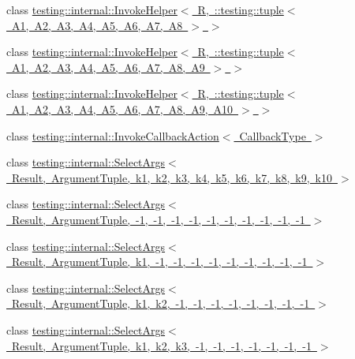 \begin{DoxyCompactItemize}
\item 
class \mbox{\hyperlink{classtesting_1_1internal_1_1_invoke_helper_3_01_r_00_01_1_1testing_1_1tuple_3_01_a1_00_01_a2_00_c90976166c933075c49792215d8203bb}{testing\+::internal\+::\+Invoke\+Helper$<$ R, \+::testing\+::tuple$<$ A1, A2, A3, A4, A5, A6, A7, A8 $>$ $>$}}
\item 
class \mbox{\hyperlink{classtesting_1_1internal_1_1_invoke_helper_3_01_r_00_01_1_1testing_1_1tuple_3_01_a1_00_01_a2_00_cb3e0694d0722fcc616ae618dc383e5b}{testing\+::internal\+::\+Invoke\+Helper$<$ R, \+::testing\+::tuple$<$ A1, A2, A3, A4, A5, A6, A7, A8, A9 $>$ $>$}}
\item 
class \mbox{\hyperlink{classtesting_1_1internal_1_1_invoke_helper_3_01_r_00_01_1_1testing_1_1tuple_3_01_a1_00_01_a2_00_d7025e877e4f690a17d0a7f1e26fac53}{testing\+::internal\+::\+Invoke\+Helper$<$ R, \+::testing\+::tuple$<$ A1, A2, A3, A4, A5, A6, A7, A8, A9, A10 $>$ $>$}}
\item 
class \mbox{\hyperlink{classtesting_1_1internal_1_1_invoke_callback_action}{testing\+::internal\+::\+Invoke\+Callback\+Action$<$ Callback\+Type $>$}}
\item 
class \mbox{\hyperlink{classtesting_1_1internal_1_1_select_args}{testing\+::internal\+::\+Select\+Args$<$ Result, Argument\+Tuple, k1, k2, k3, k4, k5, k6, k7, k8, k9, k10 $>$}}
\item 
class \mbox{\hyperlink{classtesting_1_1internal_1_1_select_args_3_01_result_00_01_argument_tuple_00_01-1_00_01-1_00_01-99299a766a33bd3110e39f51f43b194a}{testing\+::internal\+::\+Select\+Args$<$ Result, Argument\+Tuple, -\/1, -\/1, -\/1, -\/1, -\/1, -\/1, -\/1, -\/1, -\/1, -\/1 $>$}}
\item 
class \mbox{\hyperlink{classtesting_1_1internal_1_1_select_args_3_01_result_00_01_argument_tuple_00_01k1_00_01-1_00_01-33116bd77067572e384b90e7c70b03c4}{testing\+::internal\+::\+Select\+Args$<$ Result, Argument\+Tuple, k1, -\/1, -\/1, -\/1, -\/1, -\/1, -\/1, -\/1, -\/1, -\/1 $>$}}
\item 
class \mbox{\hyperlink{classtesting_1_1internal_1_1_select_args_3_01_result_00_01_argument_tuple_00_01k1_00_01k2_00_01-03e4fb75e6504ae34fdb48d64bb6de95}{testing\+::internal\+::\+Select\+Args$<$ Result, Argument\+Tuple, k1, k2, -\/1, -\/1, -\/1, -\/1, -\/1, -\/1, -\/1, -\/1 $>$}}
\item 
class \mbox{\hyperlink{classtesting_1_1internal_1_1_select_args_3_01_result_00_01_argument_tuple_00_01k1_00_01k2_00_01k43121451b69bc30ee1dad887e67d8807}{testing\+::internal\+::\+Select\+Args$<$ Result, Argument\+Tuple, k1, k2, k3, -\/1, -\/1, -\/1, -\/1, -\/1, -\/1, -\/1 $>$}}

\end{DoxyCompactItemize}
